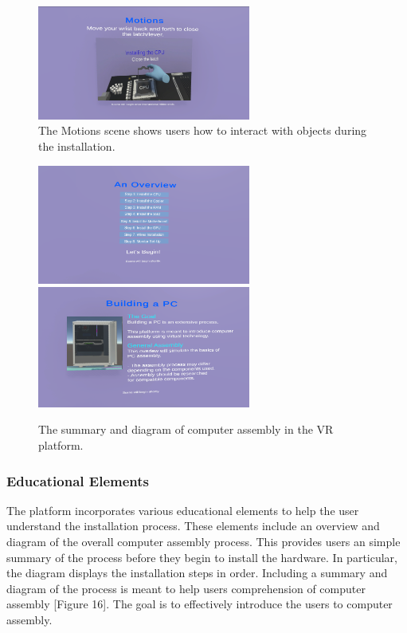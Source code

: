 \documentclass[10pt,twocolumn]{article}
\begin{document}
\begin{figure}
    \centering
    \includegraphics[width=7cm]{images/CPUmotions.png}
    \caption{The Motions scene shows users how to interact with objects during the installation.}
\end{figure}

\begin{figure}
    \centering
    \includegraphics[width=7cm]{images/OverviewDiagram.png}
    \includegraphics[width=7cm]{images/OverviewSummary.png}
    \caption{The summary and diagram of computer assembly in the VR platform.}
\end{figure}

\subsubsection{Educational Elements}

\par The platform incorporates various educational elements to help the user understand the installation process. These elements include an overview and diagram of the overall computer assembly process. This provides users an simple summary of the process before they begin to install the hardware. In particular, the diagram displays the installation steps in order. Including a summary and diagram of the process is meant to help users comprehension of computer assembly [Figure 16]. The goal is to effectively introduce the users to computer assembly.  
\end{document}
